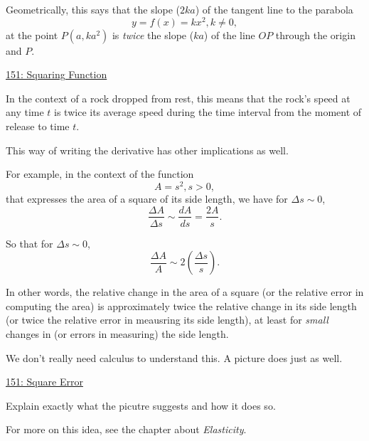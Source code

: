 \documentclass{ximera}
\begin{document}
Geometrically, this says that the slope ($2ka$) of the tangent line to the parabola
\[
     y=f(x) = kx^2 , k\neq 0,
\]
at the point $P(a,ka^2)$ is \emph{twice} the slope ($ka$) of the line $OP$ through the origin and $P$.

\begin{onlineOnly}
    \begin{center}
\end{center}
\end{onlineOnly}

\href{https://www.desmos.com/calculator/aamjtxiqgi}{151: Squaring Function}


In the context of a rock dropped from rest, this means that the rock's speed at any time $t$ is twice its average speed during the time interval from the moment of release to time $t$. %

This way of writing the derivative has other implications as well. 

For example, in the context of the function 
\[
    A = s^2 , s>0,
\]
that expresses the area of a square of its side length, we have for $\Delta s\sim 0$,
\[
        \frac{\Delta A}{\Delta s} \sim \frac{dA}{ds} = \frac{2A}{s} .
\]

So that for $\Delta s \sim 0$,
\[
    \frac{\Delta A}{A} \sim 2 \left( \frac{\Delta s}{s}  \right) .
\]

In other words, the relative change  in the area of a square (or the relative error in computing the area) is approximately twice the relative change in its side length  (or twice the relative error in meausring its side length), at least for \emph{small} changes in (or errors in measuring) the side length. 

We don't really need calculus to understand this. A picture does just as well.

\begin{onlineOnly}
    \begin{center}
\end{center}
\end{onlineOnly}

\href{https://www.desmos.com/calculator/h2fm6mm8ua}{151: Square Error}

\begin{question} \label{QLFmrerfd}
Explain exactly what the picutre suggests and how it does so.
\begin{freeResponse}
\end{freeResponse}
\end{question}

For more on this idea, see the chapter about \emph{Elasticity}.
\end{document}
